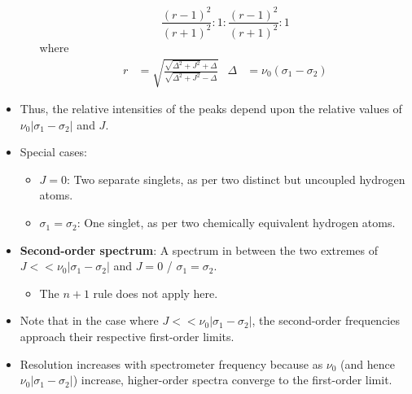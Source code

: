 \documentclass[../notes.tex]{subfiles}
\begin{document}
\begin{itemize}
\begin{itemize}
        \begin{equation*}
            \frac{(r-1)^2}{(r+1)^2}:1:\frac{(r-1)^2}{(r+1)^2}:1
        \end{equation*}
        where
        \begin{align*}
            r &= \sqrt{\frac{\sqrt{\Delta^2+J^2}+\Delta}{\sqrt{\Delta^2+J^2}-\Delta}}&
            \Delta &= \nu_0(\sigma_1-\sigma_2)
        \end{align*}
    \end{itemize}
    \item Thus, the relative intensities of the peaks depend upon the relative values of $\nu_0|\sigma_1-\sigma_2|$ and $J$.
    \item Special cases:
    \begin{itemize}
        \item $J=0$: Two separate singlets, as per two distinct but uncoupled hydrogen atoms.
        \item $\sigma_1=\sigma_2$: One singlet, as per two chemically equivalent hydrogen atoms.
    \end{itemize}
    \item \textbf{Second-order spectrum}: A spectrum in between the two extremes of $J<<\nu_0|\sigma_1-\sigma_2|$ and $J=0$ / $\sigma_1=\sigma_2$.
    \begin{itemize}
        \item The $n+1$ rule does not apply here.
    \end{itemize}
    \item Note that in the case where $J<<\nu_0|\sigma_1-\sigma_2|$, the second-order frequencies approach their respective first-order limits.
    \item Resolution increases with spectrometer frequency because as $\nu_0$ (and hence $\nu_0|\sigma_1-\sigma_2|$) increase, higher-order spectra converge to the first-order limit.
\end{itemize}
\end{document}
